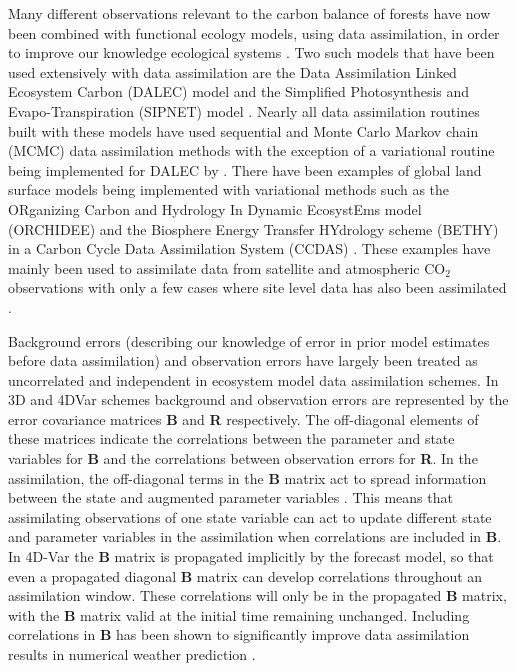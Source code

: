 \documentclass[review]{elsarticle}
\begin{document}
Many different observations relevant to the carbon balance of forests have now been combined with functional ecology models, using data assimilation, in order to improve our knowledge ecological systems \citep{zobitz2011primer, fox2009reflex, richardson2010estimating, Quaife2008, Zobitz2014, Niu2014}. Two such models that have been used extensively with data assimilation are the Data Assimilation Linked Ecosystem Carbon (DALEC) model \citep{williams2005improved} and the Simplified Photosynthesis and Evapo-Transpiration (SIPNET) model \citep{braswell2005estimating}. Nearly all data assimilation routines built with these models have used sequential and Monte Carlo Markov chain (MCMC) data assimilation methods with the exception of a variational routine being implemented for DALEC by \citet{delahaies2013regularization}. There have been examples of global land surface models being implemented with variational methods such as the ORganizing Carbon and Hydrology In Dynamic EcosystEms model (ORCHIDEE) \citep{Krinner2005} and the Biosphere Energy Transfer HYdrology scheme (BETHY) in a Carbon Cycle Data Assimilation System (CCDAS) \citep{Kaminski2013}. These examples have mainly been used to assimilate data from satellite and atmospheric $\text{CO}_{2}$ observations with only a few cases where site level data has also been assimilated \citep{Verbeeck2011, Bacour2015}.

Background errors (describing our knowledge of error in prior model estimates before data assimilation) and observation errors have largely been treated as uncorrelated and independent in ecosystem model data assimilation schemes. In 3D and 4DVar schemes background and observation errors are represented by the error covariance matrices \textbf{B} and \textbf{R} respectively. The off-diagonal elements of these matrices indicate the correlations between the parameter and state variables for \textbf{B} and the correlations between observation errors for \textbf{R}. In the assimilation, the off-diagonal terms in the \textbf{B} matrix act to spread information between the state and augmented parameter variables \citep{kalnay2003atmospheric}. This means that assimilating observations of one state variable can act to update different state and parameter variables in the assimilation when correlations are included in \textbf{B}. In 4D-Var the \textbf{B} matrix is propagated implicitly by the forecast model, so that even a propagated diagonal \textbf{B} matrix can develop correlations throughout an assimilation window. These correlations will only be in the propagated \textbf{B} matrix, with the \textbf{B} matrix valid at the initial time remaining unchanged. Including correlations in \textbf{B} has been shown to significantly improve data assimilation results in numerical weather prediction \citep{bannister2008review}. 
\end{document}
